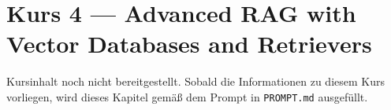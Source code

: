 \chapter{Kurs 4 --- Advanced RAG with Vector Databases and Retrievers}

\begin{luecke}
Kursinhalt noch nicht bereitgestellt. Sobald die Informationen zu diesem Kurs vorliegen,
wird dieses Kapitel gem\"a\ss{} dem Prompt in \texttt{PROMPT.md} ausgef\"ullt.
\end{luecke}

